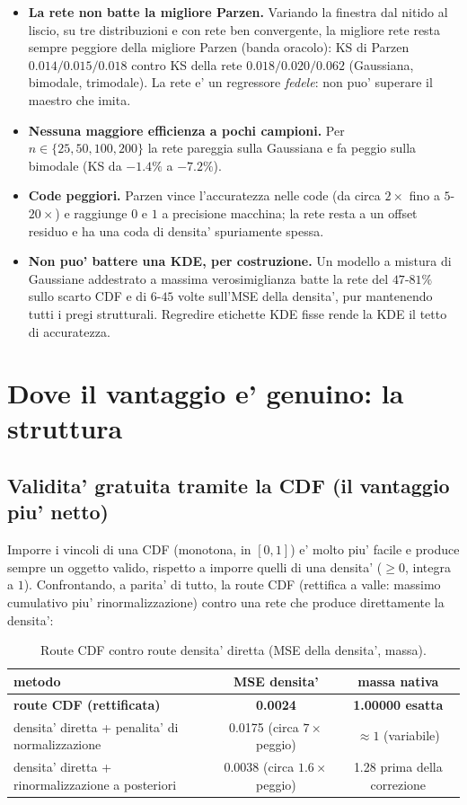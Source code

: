 \documentclass[11pt]{article}
\begin{document}
\begin{itemize}
  \item \textbf{La rete non batte la migliore Parzen.} Variando la finestra dal nitido al liscio, su
  tre distribuzioni e con rete ben convergente, la migliore rete resta sempre peggiore della migliore
  Parzen (banda oracolo): KS di Parzen $0.014/0.015/0.018$ contro KS della rete $0.018/0.020/0.062$
  (Gaussiana, bimodale, trimodale). La rete e' un regressore \emph{fedele}: non puo' superare il
  maestro che imita.
  \item \textbf{Nessuna maggiore efficienza a pochi campioni.} Per $n \in \{25,50,100,200\}$ la rete
  pareggia sulla Gaussiana e fa peggio sulla bimodale (KS da $-1.4\%$ a $-7.2\%$).
  \item \textbf{Code peggiori.} Parzen vince l'accuratezza nelle code (da circa $2\times$ fino a
  $5$-$20\times$) e raggiunge $0$ e $1$ a precisione macchina; la rete resta a un offset residuo e ha
  una coda di densita' spuriamente spessa.
  \item \textbf{Non puo' battere una KDE, per costruzione.} Un modello a mistura di Gaussiane
  addestrato a massima verosimiglianza batte la rete del $47$-$81\%$ sullo scarto CDF e di $6$-$45$
  volte sull'MSE della densita', pur mantenendo tutti i pregi strutturali. Regredire etichette KDE
  fisse rende la KDE il tetto di accuratezza.
\end{itemize}

\section{Dove il vantaggio e' genuino: la struttura}

\subsection{Validita' gratuita tramite la CDF (il vantaggio piu' netto)}

Imporre i vincoli di una CDF (monotona, in $[0,1]$) e' molto piu' facile e produce sempre un oggetto
valido, rispetto a imporre quelli di una densita' ($\ge 0$, integra a $1$). Confrontando, a parita' di
tutto, la route CDF (rettifica a valle: massimo cumulativo piu' rinormalizzazione) contro una rete che
produce direttamente la densita':

\begin{table}[H]
  \centering
  \caption{Route CDF contro route densita' diretta (MSE della densita', massa).}
  \begin{tabular}{lcc}
    \toprule
    metodo & MSE densita' & massa nativa \\
    \midrule
    \textbf{route CDF (rettificata)} & \textbf{0.0024} & \textbf{1.00000 esatta} \\
    densita' diretta + penalita' di normalizzazione & 0.0175 (circa $7\times$ peggio) & $\approx 1$ (variabile) \\
    densita' diretta + rinormalizzazione a posteriori & 0.0038 (circa $1.6\times$ peggio) & 1.28 prima della correzione \\
    \bottomrule
  \end{tabular}
\end{table}
\end{document}
